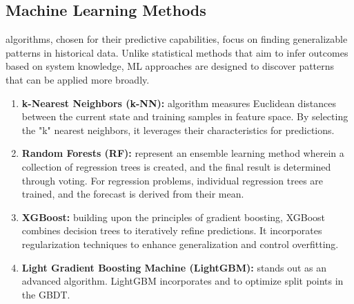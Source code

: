 \documentclass[12pt]{uomthesis}
\begin{document}
\subsection{Machine Learning Methods}
 algorithms, chosen for their predictive capabilities, focus on finding generalizable patterns in historical data. Unlike statistical methods that aim to infer outcomes based on system knowledge, ML approaches are designed to discover patterns that can be applied more broadly. 
\begin{enumerate}
    \item \textbf{k-Nearest Neighbors (k-NN):}  \cite{zhang2015gefcom2014} algorithm measures Euclidean distances between the current state and training samples in feature space. By selecting the "k" nearest neighbors, it leverages their characteristics for predictions.
    \item \textbf{Random Forests (RF):}  \cite{huertas2018using} represent an ensemble learning method wherein a collection of regression trees is created, and the final result is determined through voting. For regression problems, individual regression trees are trained, and the forecast is derived from their mean.
    \item \textbf{XGBoost:}  \cite{li2018probabilistic,obiora2021implementing} building upon the principles of gradient boosting, XGBoost combines decision trees to iteratively refine predictions. It incorporates regularization techniques to enhance generalization and control overfitting.
    \item \textbf{Light Gradient Boosting Machine (LightGBM):}  \cite{persson2017multi} stands out as an advanced  algorithm. LightGBM incorporates  and  to optimize split points in the GBDT.
\end{enumerate}
\end{document}
